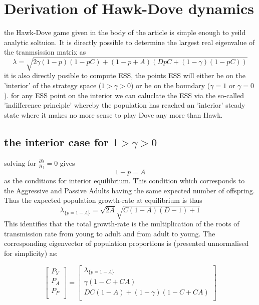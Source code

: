 \documentclass[journal,article,accept,oneauthors,pdftex,10pt,a4paper]{mdpi}
\begin{document}



\appendix

\section{Derivation of Hawk-Dove dynamics}

the Hawk-Dove game given in the body of the article is simple enough to yeild analytic soltuion.
It is directly possible to determine the largest real eigenvalue of the tranmsission matrix as $$ \lambda = \sqrt{2\gamma(1-p)(1-pC)+(1-p+A)(DpC+(1-\gamma)(1-pC))} $$
it is also directly posible to compute ESS, the points ESS will either be on the 'interior' of the strategy space ($1>\gamma >0$) or be on the boundary ($\gamma=1$ or $\gamma=0$).
for any ESS point on the interior we can caluclate the ESS via the so-called 'indifference principle'\cite{markov5} whereby the population has reached an 'interior' steady state where it makes no more sense to play Dove any more than Hawk.

\subsection{the interior case for $1>\gamma >0$}

solving for $\frac{\partial \lambda}{\partial \gamma}=0$ gives $$ 1-p=A $$ as the conditions for interior equilibrium.  This condition which corresponds to the Aggressive and Passive Adults having the same expected number of offspring.
Thus the expected population growth-rate at equilibrium is thus $$\lambda_{\{p=1-A\}} = \sqrt{2A}\sqrt{C(1-A)(D-1)+1}$$ This identifies that the total growth-rate is the multiplication of the roots of transmission rate from young to adult and from adult to young.
The corresponding eigenvector of population proportions is (presented unnormalised for simplicity) as:

$$ \begin{bmatrix}
    P_Y \\
    P_A \\
    P_P \\
\end{bmatrix} = \begin{bmatrix}
    \lambda_{\{p=1-A\}} \\
    \gamma(1-C+CA) \\
    DC(1-A) + (1-\gamma)(1-C+CA) \\
\end{bmatrix} $$
\end{document}
